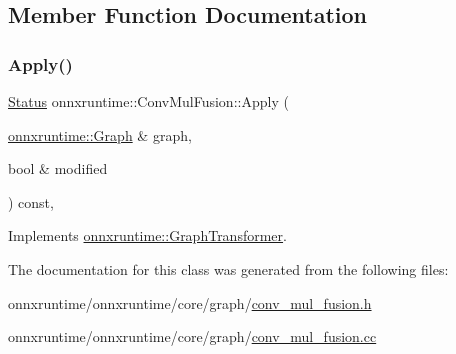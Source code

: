 \subsection{Member Function Documentation}
\mbox{\label{classonnxruntime_1_1ConvMulFusion_abea2001e37642a6e2c667e115b6b23f0}} 
\subsubsection{\texorpdfstring{Apply()}{Apply()}}
{\footnotesize\ttfamily \mbox{\hyperlink{classonnxruntime_1_1common_1_1Status}{Status}} onnxruntime\+::\+Conv\+Mul\+Fusion\+::\+Apply (\begin{DoxyParamCaption}\item[{\mbox{\hyperlink{classonnxruntime_1_1Graph}{onnxruntime\+::\+Graph}} \&}]{graph,  }\item[{bool \&}]{modified }\end{DoxyParamCaption}) const\hspace{0.3cm}{\ttfamily [override]}, {\ttfamily [virtual]}}



Implements \mbox{\hyperlink{classonnxruntime_1_1GraphTransformer_a690d351da797884409b1d7aa584e33b5}{onnxruntime\+::\+Graph\+Transformer}}.



The documentation for this class was generated from the following files\+:\begin{DoxyCompactItemize}
\item 
onnxruntime/onnxruntime/core/graph/\mbox{\hyperlink{conv__mul__fusion_8h}{conv\+\_\+mul\+\_\+fusion.\+h}}\item 
onnxruntime/onnxruntime/core/graph/\mbox{\hyperlink{conv__mul__fusion_8cc}{conv\+\_\+mul\+\_\+fusion.\+cc}}\end{DoxyCompactItemize}
